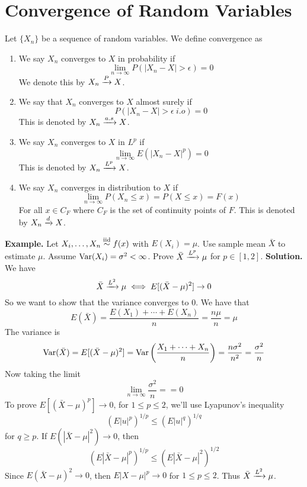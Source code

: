 \documentclass[openany]{report}
\begin{document}
    \chapter{Convergence of Random Variables}
    \begin{definition}
        Let $\{X_n\}$ be a sequence of random variables. We define convergence as 
        \begin{enumerate}[label=(\roman*)]
            \item We say $X_n$ converges to $X$ in probability if 
            \[\lim_{n\rightarrow\infty}P(|X_n-X| > \epsilon) = 0\]
            We denote this by $X_n \xrightarrow{P} X$. 
            \item We say that $X_n$ converges to $X$ almost surely if 
            \[P(|X_n - X| > \epsilon \ i.o) = 0\]
            This is denoted by $X_n \xrightarrow{a.s} X$.
            \item We say $X_n$ converges to $X$ in $L^p$ if 
            \[\lim_{n\rightarrow\infty}E(|X_n-X|^p) = 0\]
            This is denoted by $X_n \xrightarrow{L^{p}} X$.
            \item We say $X_n$ converges in distribution to $X$ if 
            \[\lim_{n\rightarrow \infty}P(X_n \leq x) = P(X \leq x) = F(x)\]
            For all $x \in C_F$ where $C_F$ is the set of continuity points of $F$. This is denoted by $X_n \xrightarrow{d} X$. 
        \end{enumerate}
    \end{definition}
    \noindent
    \textbf{Example.} Let $X_i,\ldots, X_n \overset{\mathrm{iid}}{\sim} f(x)$ with $E(X_i) = \mu$. Use sample mean $\bar{X}$ to estimate $\mu$. Assume $\operatorname{Var}(X_i) = \sigma^2 < \infty$. Prove $\bar{X} \xrightarrow{L^{p}} \mu$ for $p \in [1,2]$.
    \textbf{Solution.}  
    We have
    \[\bar{X} \xrightarrow{L^{2}} \mu \iff E[(\bar{X} - \mu)^2] \rightarrow 0\]
    So we want to show that the variance converges to 0. We have that 
    \[E(\bar{X}) = \frac{E(X_1)+ \cdots + E(X_n)}{n} = \frac{n\mu}{n} = \mu\]
    The variance is 
    \[\operatorname{Var}(\bar{X}) = E[(\bar{X}-\mu)^2] = \operatorname{Var}\left(\frac{X_1 + \cdots + X_n}{n}\right) = \frac{n\sigma^2}{n^2} = \frac{\sigma^2}{n}\]
    Now taking the limit 
    \[\lim_{n\rightarrow \infty}\frac{\sigma^2}{n} = = 0\]
    To prove $E[(\bar{X} - \mu)^p] \rightarrow 0$, for $1 \leq p \leq 2$, we'll use Lyapunov's inequality
    \[(E|u|^p)^{1/p} \leq (E|u|^q)^{1/q}\]
    for $q \geq p$. If $E(|\bar{X}-\mu|^2) \rightarrow 0$, then 
    \[(E|\bar{X}-\mu|^p)^{1/p} \leq (E|\bar{X}-\mu|^2)^{1/2}\]
    Since $E(\bar{X} - \mu)^2 \rightarrow 0$, then $E|X - \mu|^p \rightarrow 0$ for $1 \leq p \leq 2$. Thus $\bar{X} \xrightarrow{L^{2}} \mu$. 
    
\end{document}

